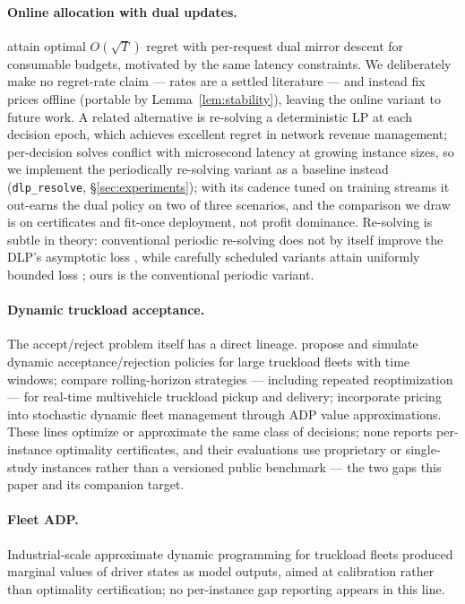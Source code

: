\documentclass[11pt]{article}
\begin{document}
\paragraph{Online allocation with dual updates.} \citet{balseiro2020dual}
attain optimal $O(\sqrt{T})$ regret with per-request dual mirror descent
for consumable budgets, motivated by the same latency constraints. We
deliberately make no regret-rate claim --- rates are a settled
literature --- and instead fix prices offline (portable by
Lemma~\ref{lem:stability}), leaving the online variant to future work.
A related alternative is re-solving a deterministic LP at each decision
epoch, which achieves excellent regret in network revenue management;
per-decision solves conflict with microsecond latency at growing
instance sizes, so we implement the periodically re-solving variant
as a baseline instead (\texttt{dlp\_resolve},
\S\ref{sec:experiments}); with its cadence tuned on training streams
it out-earns the dual policy on two of three scenarios, and the
comparison we draw is on certificates and fit-once deployment, not
profit dominance. Re-solving is subtle in theory: conventional periodic
re-solving does not by itself improve the DLP's asymptotic loss
\citep{jasinkumar2013lp}, while carefully scheduled variants attain
uniformly bounded loss \citep{bumpensantiwang2020resolving}; ours is
the conventional periodic variant.

\paragraph{Dynamic truckload acceptance.} The accept/reject problem
itself has a direct lineage. \citet{kim2004dynamic} propose and
simulate dynamic acceptance/rejection policies for large truckload
fleets with time windows; \citet{yang2004realtime} compare
rolling-horizon strategies --- including repeated reoptimization ---
for real-time multivehicle truckload pickup and delivery;
\citet{topaloglupowell2007pricing} incorporate
pricing into stochastic dynamic fleet management through ADP value
approximations. These lines optimize or approximate the same class of
decisions; none reports per-instance optimality certificates, and
their evaluations use proprietary or single-study instances rather
than a versioned public benchmark --- the two gaps this paper and its
companion \citep{chandrasekaran2026freightbidbench} target.

\paragraph{Fleet ADP.} Industrial-scale approximate dynamic programming
for truckload fleets \citep{simao2009adp,powell2007stochastic} produced
marginal values of driver states as model outputs, aimed at calibration
rather than optimality certification; no per-instance gap reporting
appears in this line.
\end{document}
